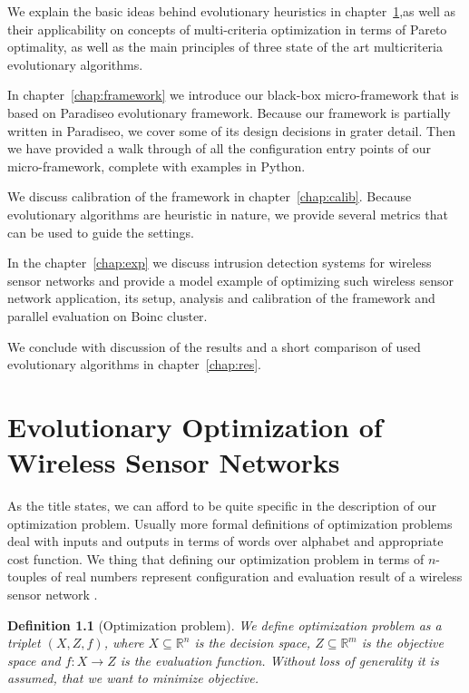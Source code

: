 \documentclass[12pt,oneside]{fithesis2}
\newtheorem{defn}{Definition}
\begin{document}
We explain the basic ideas behind evolutionary heuristics in chapter~\ref{chap:evolution},as well as their applicability on concepts of multi-criteria optimization in terms of Pareto optimality, as well as the main principles of three state of the art multicriteria evolutionary algorithms. 

In chapter~\ref{chap:framework} we introduce our black-box micro-framework that is based on Paradiseo evolutionary framework. Because our framework is partially written in Paradiseo, we cover some of its design decisions in grater detail. Then we have provided a walk through of all the configuration entry points of our micro-framework, complete with examples in Python.

We discuss calibration of the framework in chapter~\ref{chap:calib}. Because evolutionary algorithms are heuristic in nature, we provide several metrics that can be used to guide the settings. 

In the chapter~\ref{chap:exp} we discuss intrusion detection systems for wireless sensor networks and provide a model example of optimizing such wireless sensor network application, its setup, analysis and calibration of the framework and parallel evaluation on Boinc cluster.

We conclude with discussion of the results and a short comparison of used evolutionary algorithms in chapter~\ref{chap:res}.

\chapter{Evolutionary Optimization of Wireless Sensor Networks}
\label{chap:evolution}
As the title states, we can afford to be quite specific in the description of our optimization problem. Usually more formal definitions of optimization problems deal with inputs and outputs in terms of words over alphabet and appropriate cost function. We thing that defining our optimization problem in terms of $n$-touples of real numbers represent configuration and evaluation result of a wireless sensor network . 

\begin{defn}[Optimization problem]
We define optimization problem as a triplet $(X,Z,f)$,
 where $X \subseteq \mathbb{R}^n$ is the decision space,
$Z \subseteq \mathbb{R}^m$ is the objective space and $f:X \to Z$ is the evaluation function.
Without loss of generality it is assumed, that we want to minimize objective.
\end{defn}
\end{document}
